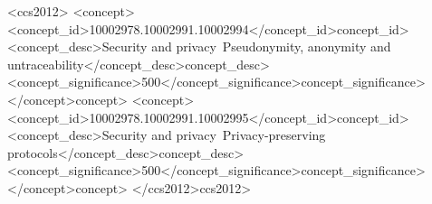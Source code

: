 
\fancyhf{} %
\fancyfoot[C]{\thepage}


\begin{CCSXML}
  <ccs2012>
  <concept>
  <concept_id>10002978.10002991.10002994</concept_id>concept_id>
  <concept_desc>Security and privacy~Pseudonymity, anonymity and untraceability</concept_desc>concept_desc>
  <concept_significance>500</concept_significance>concept_significance>
  </concept>concept>
  <concept>
  <concept_id>10002978.10002991.10002995</concept_id>concept_id>
  <concept_desc>Security and privacy~Privacy-preserving protocols</concept_desc>concept_desc>
  <concept_significance>500</concept_significance>concept_significance>
  </concept>concept>
  </ccs2012>ccs2012>
\end{CCSXML}


